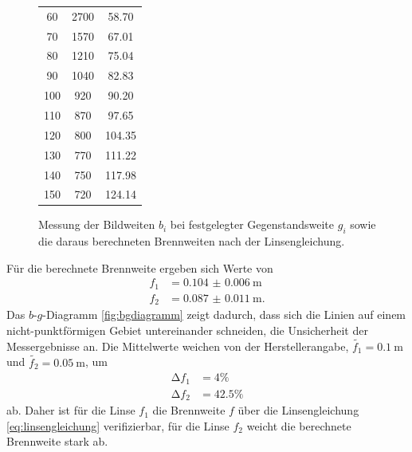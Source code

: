 \begin{figure}[hp]
\begin{minipage}{0.49\textwidth}
\begin{tabular}{S[table-format=3] S[table-format=3] S[table-format=3.2]}
				60  & 2700 &  58.70 \\
				70  & 1570 &  67.01 \\
				80  & 1210 &  75.04 \\
				90  & 1040 &  82.83 \\
				100 &  920 &  90.20 \\
				110 &  870 &  97.65 \\
				120 &  800 & 104.35 \\
				130 &  770 & 111.22 \\
				140 &  750 & 117.98 \\
				150 &  720 & 124.14 \\
			\bottomrule
			\end{tabular}
		\end{minipage}
	\caption{Messung der Bildweiten $b_i$ bei festgelegter Gegenstandsweite $g_i$ sowie die daraus berechneten Brennweiten nach der Linsengleichung.}
	\label{tab:M1}
\end{figure}
Für die berechnete Brennweite ergeben sich Werte von 
\begin{align}
	f_1 &= \SI{0.104(6)}{\meter}\\
	f_2 &= \SI{0.087(11)}{\meter}.
\end{align}
Das $b$-$g$-Diagramm \ref{fig:bgdiagramm} zeigt dadurch, dass sich die Linien auf einem nicht-punktförmigen Gebiet untereinander schneiden, die Unsicherheit der Messergebnisse an.
Die Mittelwerte weichen von der Herstellerangabe, $\tilde{f_1}=\SI{0.1}{\meter}$ und $\tilde{f_2}=\SI{0.05}{\meter}$, um 
\begin{align}
	\mathup{\Delta}f_1 &= 4\% \\	
	\mathup{\Delta}f_2 &= 42.5\%
\end{align}
ab.
Daher ist für die Linse $f_1$  die Brennweite $f$ über die Linsengleichung \eqref{eq:linsengleichung} verifizierbar, für die Linse $f_2$ weicht die berechnete Brennweite stark ab.

